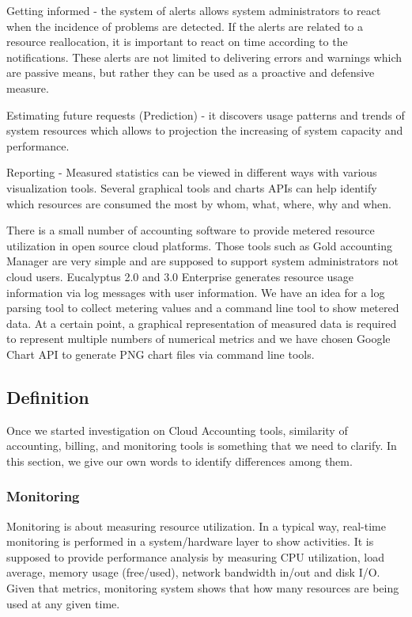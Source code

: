 \documentclass{sig-alternate}
\begin{document}
Getting informed - the system of alerts allows system administrators to react when the incidence of problems are detected. If the alerts are related to a resource reallocation, it is important to react on time according to the notifications. These alerts are not limited to delivering errors and warnings which are passive means, but rather they can be used as a proactive and defensive measure. 

Estimating future requests (Prediction) - it discovers usage patterns and trends of system resources which allows to projection the increasing of system capacity and performance. 

Reporting - Measured statistics can be viewed in different ways with various visualization tools. Several graphical tools and charts APIs can help identify which resources are consumed the most by whom, what, where, why and when. 

There is a small number of accounting software to provide metered resource utilization in open source cloud platforms. Those tools such as Gold accounting Manager are very simple and are supposed to support system administrators not cloud users. Eucalyptus 2.0 and 3.0 Enterprise generates resource usage information via log messages with user information. We have an idea for a log parsing tool to collect metering values and a command line tool to show metered data. At a certain point, a graphical representation of measured data is required to represent multiple numbers of numerical metrics and we have chosen Google Chart API to generate PNG chart files via command line tools. 

\subsection{Definition}

Once we started investigation on Cloud Accounting tools, similarity of accounting, billing, and monitoring tools is something that we need to clarify. In this section, we give our own words to identify differences among them. 

\subsubsection{Monitoring}

Monitoring is about measuring resource utilization. In a typical way, real-time monitoring is performed in a system/hardware layer to show activities. It is supposed to provide performance analysis by measuring CPU utilization, load average, memory usage (free/used), network bandwidth in/out and disk I/O. Given that metrics, monitoring system shows that how many resources are being used at any given time. 
\end{document}
